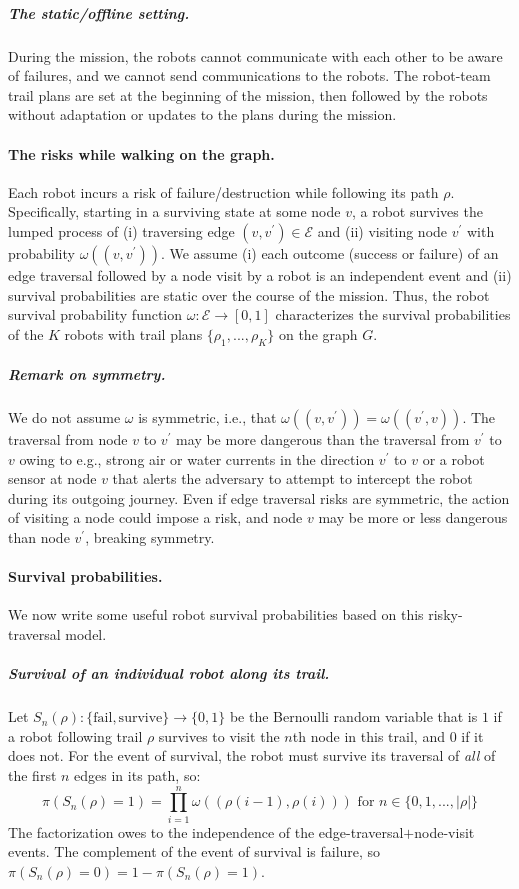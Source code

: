 \documentclass[11pt, oneside]{article}
\begin{document}
\subparagraph{The static/offline setting.} During the mission, the robots cannot communicate with each other to be aware of failures, and we cannot send communications to the robots. The robot-team trail plans are set at the beginning of the mission, then followed by the robots without adaptation or updates to the plans during the mission. 

\paragraph{The risks while walking on the graph.}
Each robot incurs a risk of failure/destruction while following its path $\rho$. 
Specifically, starting in a surviving state at some node $v$, a robot survives the lumped process of (i) traversing edge $(v, v^\prime) \in \mathcal{E}$ and (ii) visiting node $v^\prime$ with probability $\omega((v, v^\prime))$. 
We assume (i) each outcome (success or failure) of an edge traversal followed by a node visit by a robot is an independent event and (ii) survival probabilities are static over the course of the mission. 
Thus, the robot survival probability function $\omega: \mathcal{E} \rightarrow [0, 1]$ characterizes the survival probabilities of the $K$ robots with trail plans $\{\rho_1, ..., \rho_K\}$ on the graph $G$.%

\subparagraph{Remark on symmetry.} We do not assume $\omega$ is symmetric, i.e., that $\omega((v, v^\prime)) = \omega((v^\prime, v))$. The traversal from node $v$ to $v^\prime$ may be more dangerous than the traversal from $v^\prime$ to $v$ owing to e.g., strong air or water currents in the direction $v^\prime$ to $v$ or a robot sensor at node $v$ that alerts the adversary to attempt to intercept the robot during its outgoing journey. Even if edge traversal risks are symmetric, the action of visiting a node could impose a risk, and node $v$ may be more or less dangerous than node $v^\prime$, breaking symmetry. 

\paragraph{Survival probabilities.} We now write some useful robot survival probabilities based on this risky-traversal model.
\subparagraph{Survival of an individual robot along its trail.}
Let $S_n(\rho) : \{\text{fail}, \text{survive}\} \rightarrow \{0, 1\} $ be the Bernoulli random variable that is $1$ if a robot following trail $\rho$ survives to visit the $n$th node in this trail, and $0$ if it does not. For the event of survival, the robot must survive its traversal of \emph{all} of the first $n$ edges in its path, so:
\begin{equation}
	\pi(S_n(\rho) = 1) = \prod_{i=1}^n \omega((\rho(i-1), \rho(i))) \text{ for } n\in \{0, 1, ..., \lvert \rho \rvert\} \label{eq:pi_S_n}
\end{equation} The factorization owes to the independence of the edge-traversal$+$node-visit events.
The complement of the event of survival is failure, so $\pi(S_n(\rho) = 0)=1-\pi(S_n(\rho) = 1)$.
\end{document}
